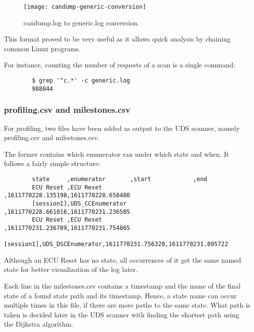 \begin{figure}[h]
    \centering
    \texttt{[image: candump-generic-conversion]}
    \caption{candump.log to generic.log conversion.}
    \label{fig:candump-generic-conversion}
\end{figure}

This format proved to be very useful as it allows quick analysis by chaining common Linux programs.

For instance, counting the number of requests of a scan is a single command:
\begin{samepage}
    \begin{verbatim}
        $ grep '^c.*' -c generic.log
        988844
    \end{verbatim}
\end{samepage}

\subsubsection{profiling.csv and milestones.csv}

For profiling, two files have been added as output to the UDS scanner, namely profiling.csv and milestones.csv.

The former contains which enumerator ran under which state and when. It follows a fairly simple structure:

\begin{samepage}
    \begin{verbatim}
        state     ,enumerator       ,start            ,end
        ECU Reset ,ECU Reset        ,1611770228.135198,1611770228.658480
        [session1],UDS_CCEnumerator ,1611770228.661016,1611770231.236505
        ECU Reset ,ECU Reset        ,1611770231.236789,1611770231.754865
        [session1],UDS_DSCEnumerator,1611770231.756320,1611770231.895722
    \end{verbatim}
\end{samepage}

Although an ECU Reset has no state, all occurrences of it get the same named state for better visualization of the log later.

Each line in the milestones.csv contains a timestamp and the name of the final state of a found state path and its timestamp. Hence, a state name can occur multiple times in this file, if there are more paths to the same state. What path is taken is decided later in the UDS scanner with finding the shortest path using the Dijkstra algorithm.

